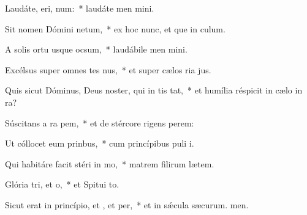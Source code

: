 \item Laudáte, eri, num:~* laudáte men mini.
\item Sit nomen Dómini netum,~* ex hoc nunc, et que in culum.
\item A solis ortu usque  ocsum,~* laudábile men mini.
\item Excélsus super omnes tes nus,~* et super cælos ria jus.
\item Quis sicut Dóminus, Deus noster, qui in tis tat,~* et humília réspicit in cælo  in ra?
\item Súscitans a ra pem,~* et de stércore rigens perem:
\item Ut cóllocet eum  prinbus,~* cum princípibus puli i.
\item Qui habitáre facit stéri in mo,~* matrem filirum lætem.
\item Glória tri, et o,~* et Spitui to.
\item Sicut erat in princípio, et , et per,~* et in sǽcula sæcurum. men.
